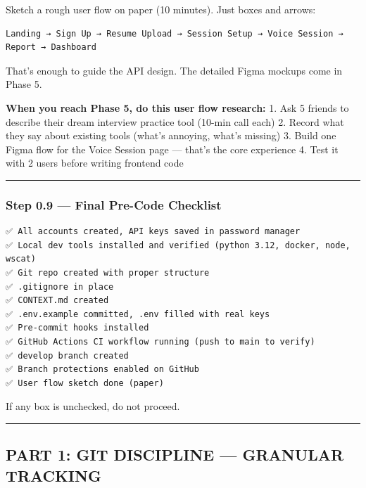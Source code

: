 \documentclass[
  11pt,
]{article}
\begin{document}
Sketch a rough user flow on paper (10 minutes). Just boxes and arrows:

\begin{lstlisting}
Landing → Sign Up → Resume Upload → Session Setup → Voice Session → Report → Dashboard
\end{lstlisting}

That's enough to guide the API design. The detailed Figma mockups come
in Phase 5.

\textbf{When you reach Phase 5, do this user flow research:} 1. Ask 5
friends to describe their dream interview practice tool (10-min call
each) 2. Record what they say about existing tools (what's annoying,
what's missing) 3. Build one Figma flow for the Voice Session page ---
that's the core experience 4. Test it with 2 users before writing
frontend code

\begin{center}\rule{0.5\linewidth}{0.5pt}\end{center}

\hypertarget{step-0.9-final-pre-code-checklist}{%
\subsubsection{Step 0.9 --- Final Pre-Code
Checklist}\label{step-0.9-final-pre-code-checklist}}

\begin{lstlisting}
✅ All accounts created, API keys saved in password manager
✅ Local dev tools installed and verified (python 3.12, docker, node, wscat)
✅ Git repo created with proper structure
✅ .gitignore in place
✅ CONTEXT.md created
✅ .env.example committed, .env filled with real keys
✅ Pre-commit hooks installed
✅ GitHub Actions CI workflow running (push to main to verify)
✅ develop branch created
✅ Branch protections enabled on GitHub
✅ User flow sketch done (paper)
\end{lstlisting}

If any box is unchecked, do not proceed.

\begin{center}\rule{0.5\linewidth}{0.5pt}\end{center}

\hypertarget{part-1-git-discipline-granular-tracking}{%
\subsection{PART 1: GIT DISCIPLINE --- GRANULAR
TRACKING}\label{part-1-git-discipline-granular-tracking}}
\end{document}
